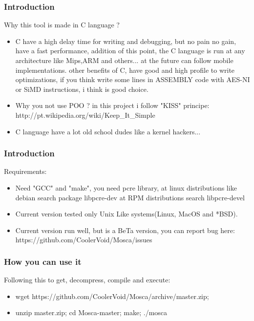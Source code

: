 \documentclass[serif,mathserif]{beamer}
\begin{document}
\begin{frame}
  \frametitle{Introduction}
  Why this tool is made in C language ?
  \begin{itemize}
  \item  C have a high delay time for writing and debugging, but no pain no gain, have a fast performance, addition of this point, the C language is run at any architecture like Mips,ARM and others... at the future can follow mobile implementations. other benefits of C,  have good and high profile to write optimizations, if you think write some lines in ASSEMBLY code with AES-NI or SiMD instructions, i think is good choice. 
  \item  Why you not use POO ? in this project i follow "KISS" principe: http://pt.wikipedia.org/wiki/Keep\_It\_Simple
  \item  C language have a lot old school dudes like a kernel hackers... 
  \end{itemize}
\end{frame}



\begin{frame}
  \frametitle{Introduction}
  Requirements:
  \begin{itemize}
  \item  Need "GCC" and "make", you need pcre library, at linux distributions like debian search package libpcre-dev at RPM distributions search libpcre-devel 
  \item  Current version tested only Unix Like systems(Linux, MacOS and *BSD).
  \item  Current version run well, but is a BeTa version, you can report bug here: https://github.com/CoolerVoid/Mosca/issues
  \end{itemize}
\end{frame}


\begin{frame}
  \frametitle{How you can use it}
  Following this to get, decompress, compile and execute:
  \begin{itemize}
  \item wget https://github.com/CoolerVoid/Mosca/archive/master.zip; 
  \item unzip master.zip; cd Mosca-master; make; ./mosca
  \end{itemize}
\end{frame}
\end{document}
